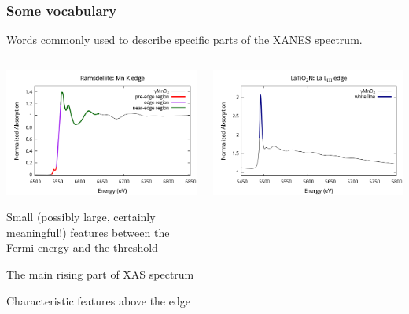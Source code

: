 \documentclass[10pt, xcolor=x11names, compress]{beamer}
\begin{document}
\begin{frame}
  \frametitle{Some vocabulary}
  Words commonly used to describe specific parts of the XANES spectrum.

  \begin{columns}[T]
    \begin{column}{0.5\linewidth}
      \includegraphics[width=\linewidth]{../i2x/images/rams/ramsdellite.png}

      \small

      \begin{description}[edge]
      \item[{\color{red}pre-edge}] Small (possibly large, certainly
        meaningful!) features between the Fermi energy and the
        threshold
      \item[{\color{DarkOrchid2}edge}] The main rising part of XAS spectrum
      \item[{\color{Green4}near-edge}] Characteristic features above the edge
      \end{description}
    \end{column}    
    \begin{column}{0.5\linewidth}
      \includegraphics[width=\linewidth]{../i2x/images/ltno/ltno.png}


\end{column}
\end{columns}
\end{frame}
\end{document}
